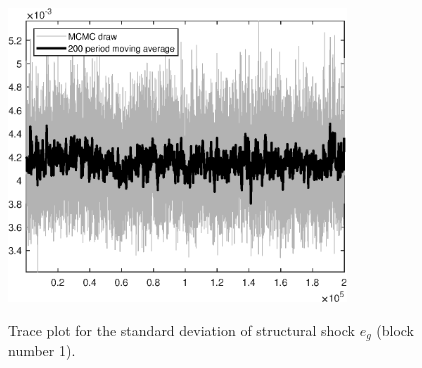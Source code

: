 \begin{figure}[H]
\centering
  \includegraphics[width=0.8\textwidth]{RBC_growth/graphs/TracePlot_SE_e_g_blck_1}\\
    \caption{Trace plot for the standard deviation of structural shock ${e_g}$ (block number 1).}
\end{figure}
